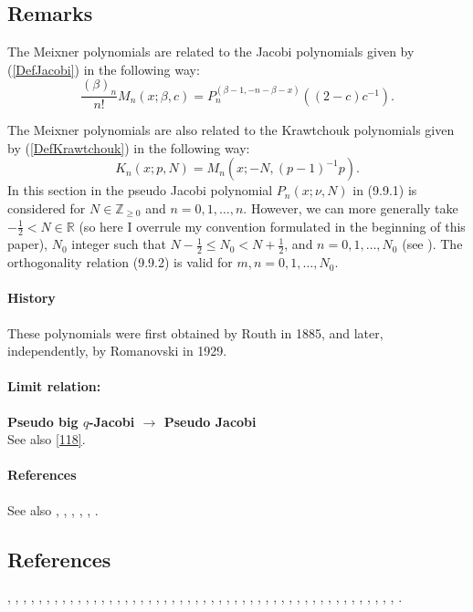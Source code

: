 \documentclass[envcountchap,graybox]{svmono}
\newcommand\RR{\mathbb{R}}
\newcommand\ZZ{\mathbb{Z}}
\newcommand\thalf{\tfrac12}
\begin{document}
\subsection*{Remarks}
The Meixner polynomials are related to the Jacobi polynomials given by (\ref{DefJacobi})
in the following way:
$$\frac{(\beta)_n}{n!}M_n(x;\beta,c)=P_n^{(\beta-1,-n-\beta-x)}((2-c)c^{-1}).$$

\noindent
The Meixner polynomials are also related to the Krawtchouk polynomials given by
(\ref{DefKrawtchouk}) in the following way:
$$K_n(x;p,N)=M_n(x;-N,(p-1)^{-1}p).$$
\label{sec9.9}
In this section in  the pseudo Jacobi polynomial $P_n(x;\nu,N)$ in (9.9.1)
is considered
for $N\in\ZZ_{\ge0}$ and $n=0,1,\ldots,n$. However, we can more generally take
$-\thalf<N\in\RR$ (so here I overrule my convention formulated in the
beginning of this paper), $N_0$ integer such that $N-\thalf\le N_0<N+\thalf$, and $n=0,1,\ldots,N_0$
(see ). The orthogonality relation (9.9.2)
is valid for $m,n=0,1,\ldots,N_0$.
%
\paragraph{History}
These polynomials were first obtained by Routh \cite{K13} in 1885, and later, independently,
by Romanovski  in 1929.
%
\paragraph{Limit relation:}
{\bf Pseudo big $q$-Jacobi $\longrightarrow$ Pseudo Jacobi}\\
See also \eqref{118}.
%
\paragraph{References}
See also , ,
, \cite{K11}, \cite{K10}, \cite{K12}.
%

\subsection*{References}
\cite{Allaway76}, \cite{NAlSalam66}, \cite{AlSalam90}, \cite{AlSalamChihara76},
\cite{AlSalamIsmail76}, \cite{Alvarez+}, \cite{AndrewsAskey85}, \cite{Area+II}, \cite{Askey75},
\cite{Askey89I}, \cite{Askey2005}, \cite{AskeyGasper77}, \cite{AskeyIsmail76},
\cite{AskeyWilson85}, \cite{AtakRahmanSuslov}, \cite{AtakSuslov88}, \cite{Bavinck98},
\cite{BavinckHaeringen}, \cite{Campigotto+}, \cite{Chihara78}, \cite{Cooper+},
\cite{Erdelyi+}, \cite{FoataLabelle}, \cite{Gabutti}, \cite{GabuttiMathis}, \cite{Gasper73I},
\cite{Gasper74}, \cite{HoareRahman}, \cite{Ismail2005II}, \cite{IsmailLetVal88},
\cite{IsmailLi}, \cite{IsmailMuldoon}, \cite{IsmailStanton97}, \cite{JinWong},
\cite{Karlin58}, \cite{Koekoek2000}, \cite{Koorn88}, \cite{LabelleYehI}, \cite{LabelleYehII},
\cite{Lesky89}, \cite{Lesky94I}, \cite{Lesky95II}, \cite{LewanowiczII}, \cite{Meixner},
\cite{Nikiforov+}, \cite{NikiforovUvarov}, \cite{Rahman78I}, \cite{ValentAssche},
\cite{Viennot}, \cite{Zarzo+}, \cite{Zeng90}.
\end{document}
